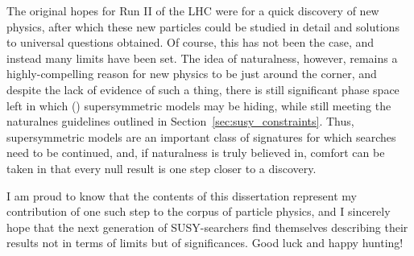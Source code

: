 The original hopes for Run II of the LHC were for a quick discovery of new physics, after which these new particles could be studied in detail and solutions to universal questions obtained.
Of course, this has not been the case, and instead many limits have been set.
The idea of naturalness, however, remains a highly-compelling reason for new physics to be just around the corner, and despite the lack of evidence of such a thing, there is still significant phase space left in which (\RPV) supersymmetric models may be hiding, while still meeting the naturalnes guidelines outlined in Section~\ref{sec:susy_constraints}.
Thus, supersymmetric models are an important class of signatures for which searches need to be continued, and, if naturalness is truly believed in, comfort can be taken in that every null result is one step closer to a discovery.

I am proud to know that the contents of this dissertation represent my contribution of one such step to the corpus of particle physics, and I sincerely hope that the next generation of SUSY-searchers find themselves describing their results not in terms of limits but of significances.
Good luck and happy hunting!
